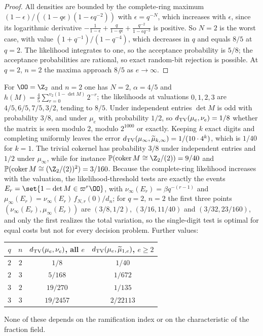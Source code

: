 \begin{proof}
All densities are bounded by the complete-ring maximum $(1-\epsilon)/((1-q\epsilon)(1-\epsilon
q^{-2}))$ with $\epsilon=q^{-N}$, which increases with $\epsilon$, since its logarithmic derivative
$-\frac1{1-\epsilon}+\frac q{1-q\epsilon}+\frac{q^{-2}}{1-\epsilon q^{-2}}$ is positive. So $N=2$
is the worst case, with value $(1+q^{-1})/(1-q^{-4})$, which decreases in $q$ and equals $8/5$ at
$q=2$. The likelihood integrates to one, so the acceptance probability is $5/8$; the acceptance
probabilities are rational, so exact random-bit rejection is possible. At $q=2$, $n=2$ the maxima
approach $8/5$ as $e\to\infty$.
\end{proof}

\begin{example}\label{spn:ex:padic-binary}
For $\OO=\Z_2$ and $n=2$ one has $N=2$, $\alpha=4/5$ and
$h(M)=\frac45\sum_{r=0}^{v_2(1-\det M)}2^{-r}$; the likelihoods at valuations $0,1,2,3$ are
$4/5,6/5,7/5,3/2$, tending to $8/5$. Under independent entries $\det M$ is odd with probability
$3/8$, and under $\mu_e$ with probability $1/2$, so $d_{\mathrm{TV}}(\mu_e,\nu_e)=1/8$ whether the matrix is
seen modulo $2$, modulo $2^{1000}$ or exactly. Keeping $k$ exact digits and completing uniformly
leaves the error $d_{\mathrm{TV}}(\mu_\infty,\widetilde\mu_{k,\infty})=1/(10\cdot4^k)$, which is $1/40$ for
$k=1$. The trivial cokernel has probability $3/8$ under independent entries and $1/2$ under
$\mu_\infty$, while for instance $\spnP(\spncoker M\cong\Z_2/(2))=9/40$ and
$\spnP(\spncoker M\cong(\Z_2/(2))^2)=3/160$. Because the complete-ring likelihood increases with the
valuation, the likelihood-threshold tests are exactly the events
$E_r=\set{1-\det M\in\varpi^r\OO}$, with
$\nu_\infty(E_r)=\beta q^{-(r-1)}$ and $\mu_\infty(E_r)=\nu_\infty(E_r)\,f_{N,r}(0)/d_n$; for $q=2$,
$n=2$ the first three points $(\nu_\infty(E_r),\mu_\infty(E_r))$ are $(3/8,1/2)$,
$(3/16,11/40)$ and $(3/32,23/160)$, and only the first realizes the total variation, so the
single-digit test is optimal for equal costs but not for every decision problem. Further values:
\begin{center}\small
\begin{tabular}{cccc}
\toprule
$q$ & $n$ & $d_{\mathrm{TV}}(\mu_e,\nu_e)$, all $e$ & $d_{\mathrm{TV}}(\mu_e,\widetilde\mu_{1,e})$, $e\ge2$\\
\midrule
$2$ & $2$ & $1/8$ & $1/40$\\
$2$ & $3$ & $5/168$ & $1/672$\\
$3$ & $2$ & $19/270$ & $1/135$\\
$3$ & $3$ & $19/2457$ & $2/22113$\\
\bottomrule
\end{tabular}
\end{center}
None of these depends on the ramification index or on the characteristic of the fraction field.
\end{example}

